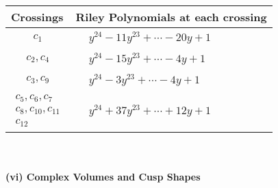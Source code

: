 \documentclass[1p]{elsarticle_modified}
\theoremstyle{definition}
\begin{document}
\begin{tabular}{m{50pt}|m{274pt}}
Crossings & \hspace{64pt}Riley Polynomials at each crossing \\
\hline $$\begin{aligned}c_{1}\end{aligned}$$&$\begin{aligned}
&y^{24}-11 y^{23}+\cdots-20 y+1
\end{aligned}$\\
\hline $$\begin{aligned}c_{2},c_{4}\end{aligned}$$&$\begin{aligned}
&y^{24}-15 y^{23}+\cdots-4 y+1
\end{aligned}$\\
\hline $$\begin{aligned}c_{3},c_{9}\end{aligned}$$&$\begin{aligned}
&y^{24}-3 y^{23}+\cdots-4 y+1
\end{aligned}$\\
\hline $$\begin{aligned}c_{5},c_{6},c_{7}\\c_{8},c_{10},c_{11}\\c_{12}\end{aligned}$$&$\begin{aligned}
&y^{24}+37 y^{23}+\cdots+12 y+1
\end{aligned}$\\
\hline
\end{tabular}\\~\\
\newpage\flushleft \textbf{(vi) Complex Volumes and Cusp Shapes}
\end{document}
